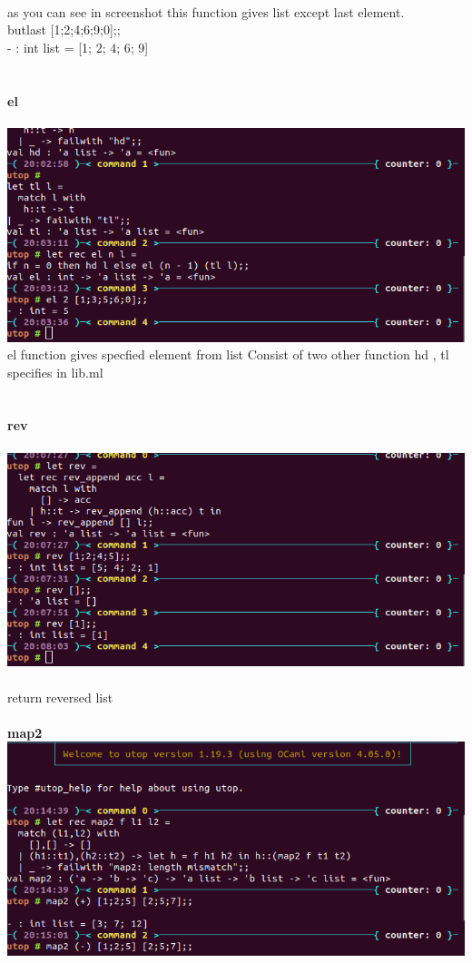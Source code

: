 \documentclass{article}
\begin{document}
\\
as you can see in screenshot this function gives list except last element.\\
butlast [1;2;4;6;9;0];; \\
- : int list = [1; 2; 4; 6; 9] \\
\\
\\
\textbf{el}\\
\\
\includegraphics{images/image8.png}
\\
el function gives specfied element from list
Consist of two other function hd , tl  specifies in lib.ml \\
\\
\\
\textbf{rev}\\
\\
\includegraphics{images/image5.png}
\\
\\
return reversed list\\
\\
\textbf{map2}
\\
\includegraphics{images/image3.png}
\end{document}
